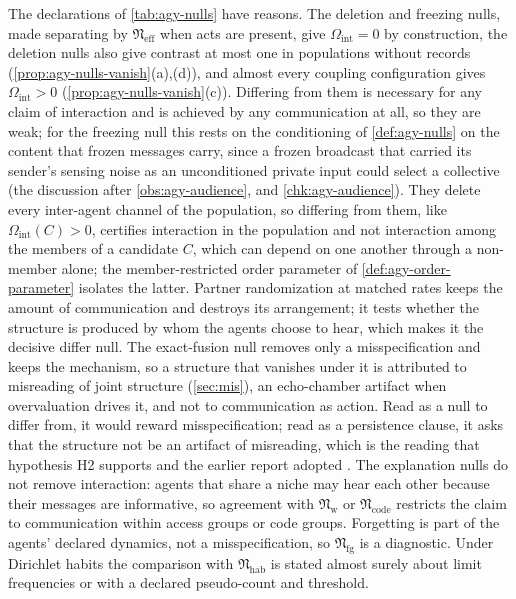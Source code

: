 The declarations of \cref{tab:agy-nulls} have reasons. The deletion and freezing nulls, made separating by $\mathfrak N_{\mathrm{eff}}$ when acts are present, give $\Omega_{\mathrm{int}}=0$ by construction, the deletion nulls also give contrast at most one in populations without records (\cref{prop:agy-nulls-vanish}(a),(d)), and almost every coupling configuration gives $\Omega_{\mathrm{int}}>0$ (\cref{prop:agy-nulls-vanish}(c)). Differing from them is necessary for any claim of interaction and is achieved by any communication at all, so they are weak; for the freezing null this rests on the conditioning of \cref{def:agy-nulls} on the content that frozen messages carry, since a frozen broadcast that carried its sender's sensing noise as an unconditioned private input could select a collective (the discussion after \cref{obs:agy-audience}, and \cref{chk:agy-audience}). They delete every inter-agent channel of the population, so differing from them, like $\Omega_{\mathrm{int}}(C)>0$, certifies interaction in the population and not interaction among the members of a candidate $C$, which can depend on one another through a non-member alone; the member-restricted order parameter of \cref{def:agy-order-parameter} isolates the latter. Partner randomization at matched rates keeps the amount of communication and destroys its arrangement; it tests whether the structure is produced by whom the agents choose to hear, which makes it the decisive differ null. The exact-fusion null removes only a misspecification and keeps the mechanism, so a structure that vanishes under it is attributed to misreading of joint structure (\cref{sec:mis}), an echo-chamber artifact when overvaluation drives it, and not to communication as action. Read as a null to differ from, it would reward misspecification; read as a persistence clause, it asks that the structure not be an artifact of misreading, which is the reading that hypothesis H2 supports and the earlier report adopted \citep{dennis2026communicating}. The explanation nulls do not remove interaction: agents that share a niche may hear each other because their messages are informative, so agreement with $\mathfrak N_{\mathrm w}$ or $\mathfrak N_{\mathrm{code}}$ restricts the claim to communication within access groups or code groups. Forgetting is part of the agents' declared dynamics, not a misspecification, so $\mathfrak N_{\mathrm{fg}}$ is a diagnostic. Under Dirichlet habits the comparison with $\mathfrak N_{\mathrm{hab}}$ is stated almost surely about limit frequencies or with a declared pseudo-count and threshold.

